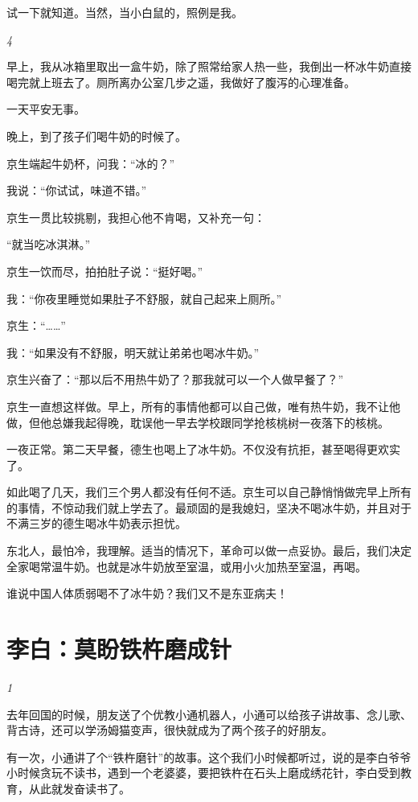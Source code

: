 \documentclass[twoside,openright,headings=optiontohead]{ctexbook} %
\begin{document}
{试一下就知道。当然，当小白鼠的，照例是我。

\emph{4}

早上，我从冰箱里取出一盒牛奶，除了照常给家人热一些，我倒出一杯冰牛奶直接喝完就上班去了。厕所离办公室几步之遥，我做好了腹泻的心理准备。

一天平安无事。

晚上，到了孩子们喝牛奶的时候了。

京生端起牛奶杯，问我：``冰的？''

我说：``你试试，味道不错。''

京生一贯比较挑剔，我担心他不肯喝，又补充一句：

``就当吃冰淇淋。''

京生一饮而尽，拍拍肚子说：``挺好喝。''

我：``你夜里睡觉如果肚子不舒服，就自己起来上厕所。''

京生：``\ldots{}\ldots{}''

我：``如果没有不舒服，明天就让弟弟也喝冰牛奶。''

京生兴奋了：``那以后不用热牛奶了？那我就可以一个人做早餐了？''

京生一直想这样做。早上，所有的事情他都可以自己做，唯有热牛奶，我不让他做，但他总嫌我起得晚，耽误他一早去学校跟同学抢核桃树一夜落下的核桃。

一夜正常。第二天早餐，德生也喝上了冰牛奶。不仅没有抗拒，甚至喝得更欢实了。

如此喝了几天，我们三个男人都没有任何不适。京生可以自己静悄悄做完早上所有的事情，不惊动我们就上学去了。最顽固的是我媳妇，坚决不喝冰牛奶，并且对于不满三岁的德生喝冰牛奶表示担忧。

东北人，最怕冷，我理解。适当的情况下，革命可以做一点妥协。最后，我们决定全家喝常温牛奶。也就是冰牛奶放至室温，或用小火加热至室温，再喝。

谁说中国人体质弱喝不了冰牛奶？我们又不是东亚病夫！

\chapter*{李白：莫盼铁杵磨成针}\label{libai-rumor}

\emph{1}

去年回国的时候，朋友送了个优教小通机器人，小通可以给孩子讲故事、念儿歌、背古诗，还可以学汤姆猫变声，很快就成为了两个孩子的好朋友。

有一次，小通讲了个``铁杵磨针''的故事。这个我们小时候都听过，说的是李白爷爷小时候贪玩不读书，遇到一个老婆婆，要把铁杵在石头上磨成绣花针，李白受到教育，从此就发奋读书了。

}
\end{document}
